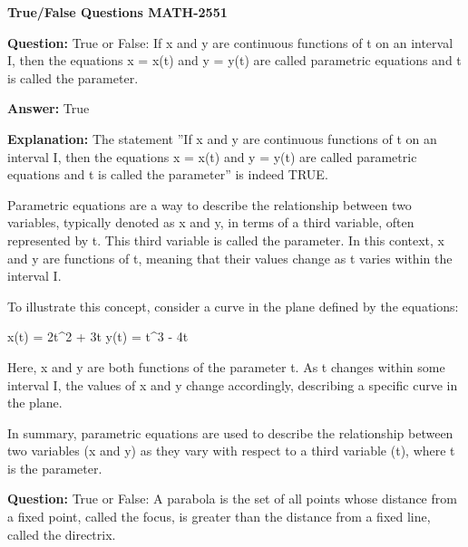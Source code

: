 \documentclass{article}
\begin{document}

\begin{center}
\textbf{\Large True/False Questions MATH-2551} \\ %
\end{center}

\vspace{1cm}






\vspace{1cm}
                \textbf {Question:} True or False: If x and y are continuous functions of t on an interval I, then the equations x = x(t) and y = y(t) are called parametric equations and t is called the parameter.
                
                \textbf{Answer:} True

                \textbf{Explanation:} The statement ''If x and y are continuous functions of t on an interval I, then the equations x = x(t) and y = y(t) are called parametric equations and t is called the parameter'' is indeed TRUE.

Parametric equations are a way to describe the relationship between two variables, typically denoted as x and y, in terms of a third variable, often represented by t. This third variable is called the parameter. In this context, x and y are functions of t, meaning that their values change as t varies within the interval I.

To illustrate this concept, consider a curve in the plane defined by the equations:

x(t) = 2t{\textasciicircum}2 + 3t
y(t) = t{\textasciicircum}3 - 4t

Here, x and y are both functions of the parameter t. As t changes within some interval I, the values of x and y change accordingly, describing a specific curve in the plane.

In summary, parametric equations are used to describe the relationship between two variables (x and y) as they vary with respect to a third variable (t), where t is the parameter.
                
                \vspace{0.5cm} 
        
            
                \textbf {Question:} True or False: A parabola is the set of all points whose distance from a fixed point, called the focus, is greater than the distance from a fixed line, called the directrix.
                
\end{document}
